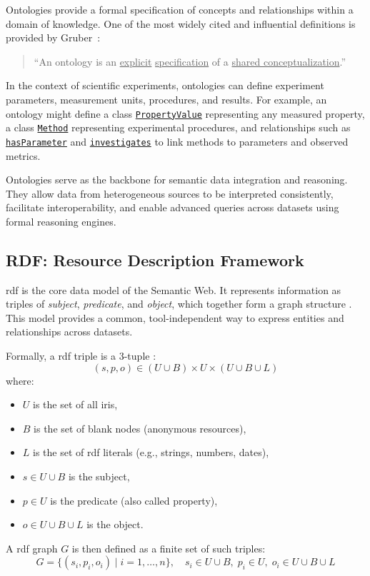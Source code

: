 Ontologies provide a formal specification of concepts and relationships within a domain of knowledge.
One of the most widely cited and influential definitions is provided by Gruber~\cite{gruber1993ontology}:
\begin{quote}
``An ontology is an \underline{explicit} \underline{specification} of a \underline{shared conceptualization}.'' 
\end{quote}

In the context of scientific experiments, ontologies can define experiment parameters, measurement units, procedures, and results. For example, an ontology might define a class 
\href{https://schema.org/PropertyValue}{\texttt{PropertyValue}} 
representing any measured property, a class 
\href{https://nfdi4ing.pages.rwth-aachen.de/metadata4ing/metadata4ing/\#Method}{\texttt{Method}} 
representing experimental procedures, and relationships such as 
\href{https://nfdi4ing.pages.rwth-aachen.de/metadata4ing/metadata4ing/\#hasParameter}{\texttt{hasParameter}} 
and 
\href{https://nfdi4ing.pages.rwth-aachen.de/metadata4ing/metadata4ing/\#investigates}{\texttt{investigates}} 
to link methods to parameters and observed metrics.

Ontologies serve as the backbone for semantic data integration and reasoning. They allow data from heterogeneous sources to be interpreted consistently, facilitate interoperability, and enable advanced queries across datasets using formal reasoning engines.

\subsection{RDF: Resource Description Framework}
\label{sec:background:rdf}

\gls{rdf} is the core data model of the Semantic Web. It represents information as triples of \textit{subject}, \textit{predicate}, and \textit{object}, which together form a graph structure \cite{rdf_concepts2014}. This model provides a common, tool-independent way to express entities and relationships across datasets.

Formally, a \gls{rdf} triple is a 3-tuple \cite{rdf_concepts2014}:
\[
(s, p, o) \in (U \cup B) \times U \times (U \cup B \cup L)
\]
where:
\begin{itemize}
    \item \(U\) is the set of all \glspl{iri},
    \item \(B\) is the set of blank nodes (anonymous resources),
    \item \(L\) is the set of \gls{rdf} literals (e.g., strings, numbers, dates),
    \item \(s \in U \cup B\) is the subject,
    \item \(p \in U\) is the predicate (also called property),
    \item \(o \in U \cup B \cup L\) is the object.
\end{itemize}
A \gls{rdf} graph \(G\) is then defined as a finite set of such triples:
\[
G = \{(s_i, p_i, o_i) \mid i = 1, \dots, n\}, \quad s_i \in U \cup B, \; p_i \in U, \; o_i \in U \cup B \cup L
\]

